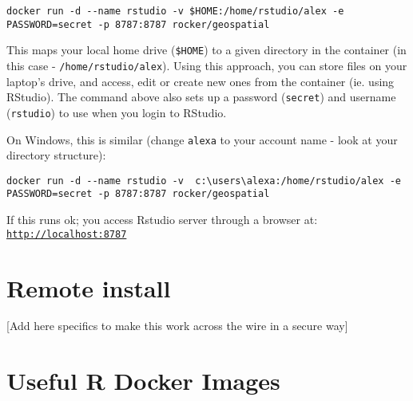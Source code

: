 \documentclass[
]{book}
\begin{document}
\begin{verbatim}
docker run -d --name rstudio -v $HOME:/home/rstudio/alex -e PASSWORD=secret -p 8787:8787 rocker/geospatial
\end{verbatim}

This maps your local home drive (\texttt{\$HOME}) to a given directory in the container (in this case - \texttt{/home/rstudio/alex}).
Using this approach, you can store files on your laptop's drive, and access, edit or create new ones from the container (ie. using RStudio).
The command above also sets up a password (\texttt{secret}) and username (\texttt{rstudio})
to use when you login to RStudio.

On Windows, this is similar (change \texttt{alexa} to your account name - look at your directory structure):

\begin{verbatim}
docker run -d --name rstudio -v  c:\users\alexa:/home/rstudio/alex -e PASSWORD=secret -p 8787:8787 rocker/geospatial
\end{verbatim}

If this runs ok; you access Rstudio server through a browser at: \href{http://localhost:8787}{\texttt{http://localhost:8787}}

\hypertarget{remote-install-1}{%
\section{Remote install}\label{remote-install-1}}

{[}Add here specifics to make this work across the wire in a secure way{]}

\hypertarget{useful-r-docker-images}{%
\section{Useful R Docker Images}\label{useful-r-docker-images}}

  
\end{document}
